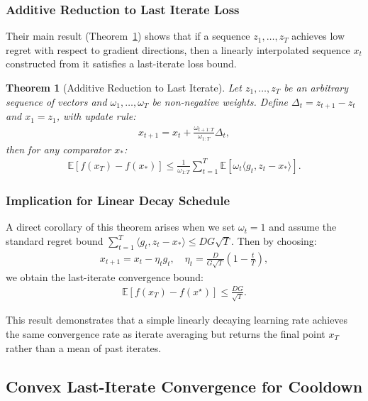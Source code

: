\documentclass[letterpaper]{article} %
\newtheorem{theorem}{Theorem}
\newcommand{\cmp}{x_{*}} %
\begin{document}
\subsubsection{Additive Reduction to Last Iterate Loss}

Their main result (Theorem~\ref{thm:additive}) shows that if a sequence $z_1, \ldots, z_T$ achieves low regret with respect to gradient directions, then a linearly interpolated sequence $x_t$ constructed from it satisfies a last-iterate loss bound.

\begin{theorem}[Additive Reduction to Last Iterate]
	Let $z_1,\dots,z_T$ be an arbitrary sequence of vectors and $\omega_1,\dots,\omega_T$ be non-negative weights. Define $\Delta_t = z_{t+1} - z_t$ and $x_1 = z_1$, with update rule:
	\begin{align*}
		x_{t+1} = x_t + \frac{\omega_{t+1:T}}{\omega_{1:T}} \Delta_t,
	\end{align*}
	then for any comparator $\cmp$:
	\begin{align*}
		\mathbb{E}[f(x_T) - f(\cmp)] \leq \frac{1}{\omega_{1:T}} \sum_{t=1}^T \mathbb{E}[\omega_t \langle g_t, z_t - \cmp \rangle].
	\end{align*}
	\label{thm:additive}
\end{theorem}

\subsubsection{Implication for Linear Decay Schedule}

A direct corollary of this theorem arises when we set $\omega_t = 1$ and assume the standard regret bound $\sum_{t=1}^T \langle g_t, z_t - \cmp \rangle \le DG\sqrt{T}$. Then by choosing:
\begin{align}
	x_{t+1} = x_t - \eta_t g_t, \quad \eta_t = \frac{D}{G\sqrt{T}}\left(1 - \frac{t}{T}\right), \label{eq:linear-decay}
\end{align}
we obtain the last-iterate convergence bound:
\begin{align}
	\mathbb{E}[f(x_T) - f(x^\star)] \le \frac{DG}{\sqrt{T}}.
\end{align}

This result demonstrates that a simple linearly decaying learning rate achieves the same convergence rate as iterate averaging but returns the final point $x_T$ rather than a mean of past iterates.

\subsection{Convex Last-Iterate Convergence for Cooldown}
\end{document}
